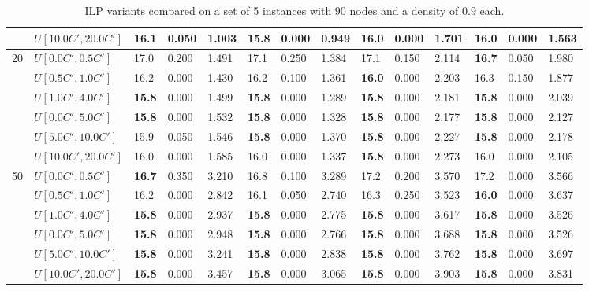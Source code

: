 \begin{table}[h]
{\begin{tabular}{|l|l||l|l|l||l|l|l||l|l|l||l|l|l|}
       & $U[10.0C',20.0C']$ & 16.1 & 0.050 & 1.003 & \textbf{15.8} & 0.000 & 0.949 & 16.0 & 0.000 & 1.701 & 16.0 & 0.000 & 1.563 \\
      \hline\hline
      \multirow{6}{*}{20} & $U[0.0C',0.5C']$ & 17.0 & 0.200 & 1.491 & 17.1 & 0.250 & 1.384 & 17.1 & 0.150 & 2.114 & \textbf{16.7} & 0.050 & 1.980 \\
       & $U[0.5C',1.0C']$ & 16.2 & 0.000 & 1.430 & 16.2 & 0.100 & 1.361 & \textbf{16.0} & 0.000 & 2.203 & 16.3 & 0.150 & 1.877 \\
       & $U[1.0C',4.0C']$ & \textbf{15.8} & 0.000 & 1.499 & \textbf{15.8} & 0.000 & 1.289 & \textbf{15.8} & 0.000 & 2.181 & \textbf{15.8} & 0.000 & 2.039 \\
       & $U[0.0C',5.0C']$ & \textbf{15.8} & 0.000 & 1.532 & \textbf{15.8} & 0.000 & 1.328 & \textbf{15.8} & 0.000 & 2.177 & \textbf{15.8} & 0.000 & 2.127 \\
       & $U[5.0C',10.0C']$ & 15.9 & 0.050 & 1.546 & \textbf{15.8} & 0.000 & 1.370 & \textbf{15.8} & 0.000 & 2.227 & \textbf{15.8} & 0.000 & 2.178 \\
       & $U[10.0C',20.0C']$ & 16.0 & 0.000 & 1.585 & 16.0 & 0.000 & 1.337 & \textbf{15.8} & 0.000 & 2.273 & 16.0 & 0.000 & 2.105 \\
      \hline\hline
      \multirow{6}{*}{50} & $U[0.0C',0.5C']$ & \textbf{16.7} & 0.350 & 3.210 & 16.8 & 0.100 & 3.289 & 17.2 & 0.200 & 3.570 & 17.2 & 0.000 & 3.566 \\
       & $U[0.5C',1.0C']$ & 16.2 & 0.000 & 2.842 & 16.1 & 0.050 & 2.740 & 16.3 & 0.250 & 3.523 & \textbf{16.0} & 0.000 & 3.637 \\
       & $U[1.0C',4.0C']$ & \textbf{15.8} & 0.000 & 2.937 & \textbf{15.8} & 0.000 & 2.775 & \textbf{15.8} & 0.000 & 3.617 & \textbf{15.8} & 0.000 & 3.526 \\
       & $U[0.0C',5.0C']$ & \textbf{15.8} & 0.000 & 2.948 & \textbf{15.8} & 0.000 & 2.766 & \textbf{15.8} & 0.000 & 3.688 & \textbf{15.8} & 0.000 & 3.526 \\
       & $U[5.0C',10.0C']$ & \textbf{15.8} & 0.000 & 3.241 & \textbf{15.8} & 0.000 & 2.838 & \textbf{15.8} & 0.000 & 3.762 & \textbf{15.8} & 0.000 & 3.697 \\
       & $U[10.0C',20.0C']$ & \textbf{15.8} & 0.000 & 3.457 & \textbf{15.8} & 0.000 & 3.065 & \textbf{15.8} & 0.000 & 3.903 & \textbf{15.8} & 0.000 & 3.831 \\
      \hline
      \end{tabular}
      }
      \caption{ILP variants compared on a set of 5 instances with $90$ nodes and a density of $0.9$ each.}
      \label{tab:pcpn90p9ILPVariant}\end{table}
      
